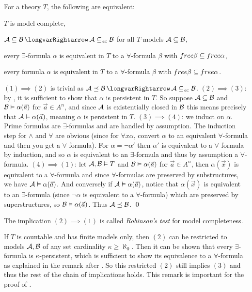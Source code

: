 \bthrm[name=modelcompleteequiv]

    For a theory $T$, the following are equivalent:
    \benum
        \item $T$ is model complete,
        \item ${\cal A}\subseteq{\cal B}\implies{\cal A}\subseteq_{\it ec}{\cal B}$ for all $T$-models ${\cal A}\subseteq{\cal B}$,
        \item every $\exists$-formula $\alpha$ is equivalent in $T$ to a $\forall$-formula $\beta$ with ${\sl free}\beta\subseteq{\sl free}\alpha$,
        \item every formula $\alpha$ is equivalent in $T$ to a $\forall$-formula $\beta$ with ${\sl free}\beta\subseteq{\sl free}\alpha$.
    \eenum

\ethrm

$(1)\implies(2)$ is trivial as ${\cal A}\preceq{\cal B}\implies{\cal A}\subseteq_{\it ec}{\cal B}$.
$(2)\implies(3)$: by , it is sufficient to show that $\alpha$ is persistent in $T$.
So suppose ${\cal A}\subseteq{\cal B}$ and ${\cal B}\vDash\alpha(\vec a)$ for $\vec a\in A^n$, and since ${\cal A}$ is existentially closed in ${\cal B}$ this means precisely that
${\cal A}\vDash\alpha(\vec a)$, meaning $\alpha$ is persistent in $T$.
$(3)\implies(4)$: we induct on $\alpha$.
Prime formulas are $\exists$-formulas and are handled by assumption.
The induction step for $\land$ and $\forall$ are obvious (since for $\forall x\alpha$, convert $\alpha$ to an equivalent $\forall$-formula and then you get a $\forall$-formula).
For $\alpha=\neg\alpha'$ then $\alpha'$ is equivalent to a $\forall$-formula by induction, and so $\alpha$ is equivalent to an $\exists$-formula and thus by assumption a $\forall$-formula.
$(4)\implies(1)$: let ${\cal A},{\cal B}\vDash T$ and ${\cal B}\vDash\alpha(\vec a)$ for $\vec a\in A^n$, then $\alpha(\vec x)$ is equivalent to a $\forall$-formula and since $\forall$-formulas are
preserved by substructures, we have ${\cal A}\vDash\alpha(\vec a)$.
And conversely if ${\cal A}\vDash\alpha(\vec a)$, notice that $\alpha(\vec x)$ is equivalent to an $\exists$-formula (since $\neg\alpha$ is equivalent to a $\forall$-formula) which are preserved
by superstructures, so ${\cal B}\vDash\alpha(\vec a)$.
Thus ${\cal A}\preceq{\cal B}$.
\qed

The implication $(2)\implies(1)$ is called {\it Robinson's test} for model completeness.

If $T$ is countable and has finite models only, then $(2)$ can be restricted to models ${\cal A},{\cal B}$ of any set cardinality $\kappa\geq\aleph_0$.
Then it can be shown that every $\exists$-formula is $\kappa$-persistent, which is sufficient to show its equivalence to a $\forall$-formula as explained in the remark after
.
So this restricted $(2)$ still implies $(3)$ and thus the rest of the chain of implications holds.
This remark is important for the proof of .

